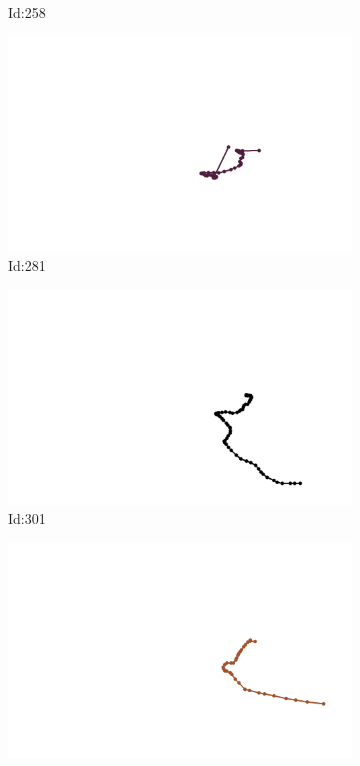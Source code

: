 \documentclass[12pt,twoside]{report}
\begin{document}
\begin{figure}
\begin{subfigure}[b]{0.20\textwidth}
\caption{Id:258}
\end{subfigure}
\begin{subfigure}[b]{0.20\textwidth}
\centering
\includegraphics[width=\textwidth]{../trajectories/281.png}
\caption{Id:281}
\end{subfigure}
\begin{subfigure}[b]{0.20\textwidth}
\centering
\includegraphics[width=\textwidth]{../trajectories/301.png}
\caption{Id:301}
\end{subfigure}
\begin{subfigure}[b]{0.20\textwidth}
\centering
\includegraphics[width=\textwidth]{../trajectories/310.png}

\end{subfigure}
\end{figure}
\end{document}
